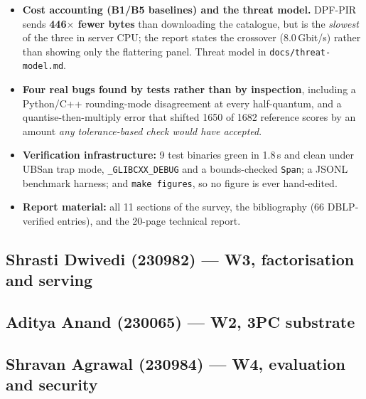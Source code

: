 \begin{itemize}
    a private read and \textbf{showed it fails}: decoys must be
    popularity-weighted to be unremarkable, so they point where the control
    already points, and 40 of them (5$\times$ the traffic) still leave the
    adversary at $0.71$ against a $0.44$ floor.
  \item \textbf{Cost accounting (B1/B5 baselines) and the threat model.}
    DPF-PIR sends \textbf{446$\times$ fewer bytes} than downloading the
    catalogue, but is the \emph{slowest} of the three in server CPU; the report
    states the crossover (8.0\,Gbit/s) rather than showing only the flattering
    panel. Threat model in \texttt{docs/threat-model.md}.
  \item \textbf{Four real bugs found by tests rather than by inspection},
    including a Python/C++ rounding-mode disagreement at every half-quantum,
    and a quantise-then-multiply error that shifted 1650 of 1682 reference
    scores by an amount \emph{any tolerance-based check would have accepted}.
  \item \textbf{Verification infrastructure:} 9 test binaries green in 1.8\,s
    and clean under UBSan trap mode, \texttt{\_GLIBCXX\_DEBUG} and a
    bounds-checked \texttt{Span}; a JSONL benchmark harness; and
    \texttt{make figures}, so no figure is ever hand-edited.
  \item \textbf{Report material:} all 11 sections of the survey, the
    bibliography (66 DBLP-verified entries), and the 20-page technical report.
\end{itemize}

\subsection*{Shrasti Dwivedi (230982) --- W3, factorisation and serving}

\vspace{2.5em}

\subsection*{Aditya Anand (230065) --- W2, 3PC substrate}

\vspace{2.5em}

\subsection*{Shravan Agrawal (230984) --- W4, evaluation and security}

